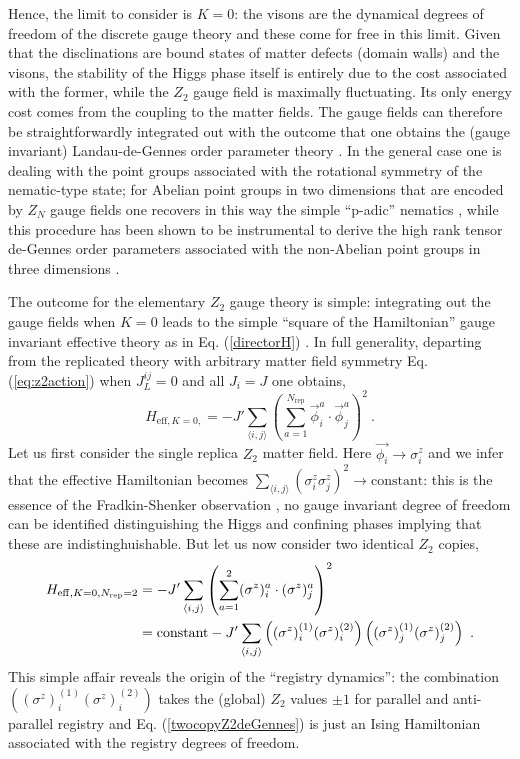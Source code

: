 Hence, the limit to consider is $K=0$: the visons are the dynamical degrees of freedom of the discrete gauge theory and these come for free in this limit. Given that the disclinations are bound states of matter defects (domain walls) and the visons, the stability of the Higgs phase itself is entirely due to the cost associated with the former, while the $Z_2$ gauge field is maximally fluctuating. Its only energy cost comes from the coupling to the matter fields. The gauge fields can therefore be straightforwardly integrated out with the outcome that one obtains the (gauge invariant)  Landau-de-Gennes order parameter theory \cite{toner95}. In the general case one is dealing with the point groups associated with the rotational symmetry of the nematic-type state; for Abelian point groups in two dimensions that are encoded by $Z_N$ gauge fields one recovers in this way the simple ``p-adic'' nematics \cite{nematic2D}, while this procedure has been shown to be instrumental to derive the high rank tensor de-Gennes order parameters associated with the non-Abelian point groups in three dimensions \cite{nonabnematic,nonabnematic1,nonabnematic2}. 

The outcome for the elementary $Z_2$ gauge theory is simple: integrating out the gauge fields when $K=0$ leads to the simple ``square of the Hamiltonian'' gauge invariant effective theory as in Eq. (\ref{directorH}) \cite{toner95}. In full generality, departing from the replicated theory with arbitrary matter field symmetry Eq. (\ref{eq:z2action}) when $J_L^{ij} =0$ and all $J_i = J$ one obtains, 
\begin{equation}
	H_{\mathrm{eff}, K =0, } = -J' \sum_{\langle i, j \rangle} \left( \sum_{a=1}^{N_\text{rep} } \vec{\phi}_i^a  \cdot \vec{\phi}_j^a \right)^2 ~.
	\label{Z2deGennes}
\end{equation}
Let us first consider the single replica $Z_2$ matter field. Here $\vec{\phi_i} \rightarrow \sigma^z_i$ and we infer that the effective Hamiltonian becomes $\sum_{\langle i, j \rangle} (\sigma^z_i \sigma^z_j ) ^2 \rightarrow \mathrm{constant}$: this is the essence of the Fradkin-Shenker observation \cite{Fradkinshenker}, no gauge invariant degree of freedom can be identified distinguishing the Higgs and confining phases implying that these are indistinghuishable. But let us now consider two identical $Z_2$ copies,
\begin{equation}
	\begin{split}
		H_{\mathrm{eff}, K =0, N_{\text{rep}} = 2} &= -J' \sum_{\langle i, j \rangle} \left( \sum_{a=1}^{2} (\sigma^z)_i^a  \cdot (\sigma^z)_j^a \right)^2 \\ &= 
		\mathrm{constant} - J'  \sum_{\langle i, j \rangle} \left( (\sigma^z)_i^{(1)} ( \sigma^z)_i^{(2)} \right) \left( ( \sigma^z)_j^{(1)} (\sigma^z)_j^{(2)} \right) \ .
	\end{split}
	\label{twocopyZ2deGennes}
\end{equation}
This simple affair reveals the origin of the ``registry dynamics'': the combination $\left( (\sigma^z)_i^{(1)} (\sigma^z)_i^{(2)} \right)$ takes the (global) $Z_2$ values $ \pm 1$ for parallel and anti-parallel registry and Eq. (\ref{twocopyZ2deGennes}) is just an Ising Hamiltonian associated with the registry degrees of freedom.

